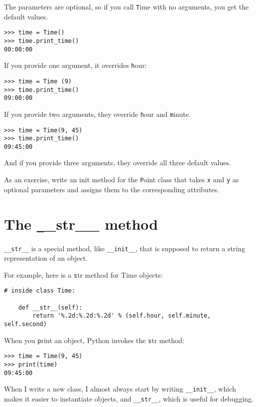\documentclass[
DIV=11,
fontsize=12,
twoside,
headinclude=false,
titlepage=firstiscover,
abstract=true,
headsepline=true,
footsepline=true,
chapterprefix=true, %
headings=big,
bibliography=totoc,%
captions=tableheading
]{scrbook}
\theoremstyle{definition}
\begin{document}
The parameters are optional, so if you call {\texttt Time} with
no arguments, you get the default values.

\begin{lstlisting}
>>> time = Time()
>>> time.print_time()
00:00:00
\end{lstlisting}
%
If you provide one argument, it overrides {\texttt hour}:

\begin{lstlisting}
>>> time = Time (9)
>>> time.print_time()
09:00:00
\end{lstlisting}
%
If you provide two arguments, they override {\texttt hour} and
{\texttt minute}.

\begin{lstlisting}
>>> time = Time(9, 45)
>>> time.print_time()
09:45:00
\end{lstlisting}
%
And if you provide three arguments, they override all three
default values.

As an exercise, write an init method for the {\texttt Point} class that takes
{\texttt x} and {\texttt y} as optional parameters and assigns
them to the corresponding attributes.


\section{The {\texttt \_\_str\_\_} method}

\verb"__str__" is a special method, like \verb"__init__",
that is supposed to return a string representation of an object.

For example, here is a {\texttt str} method for Time objects:

\begin{lstlisting}
# inside class Time:

    def __str__(self):
        return '%.2d:%.2d:%.2d' % (self.hour, self.minute, self.second)
\end{lstlisting}
%
When you {\texttt print} an object, Python invokes the {\texttt str} method:

\begin{lstlisting}
>>> time = Time(9, 45)
>>> print(time)
09:45:00
\end{lstlisting}
%
When I write a new class, I almost always start by writing 
\verb"__init__", which makes it easier to instantiate objects, and 
\verb"__str__", which is useful for debugging.
\end{document}
